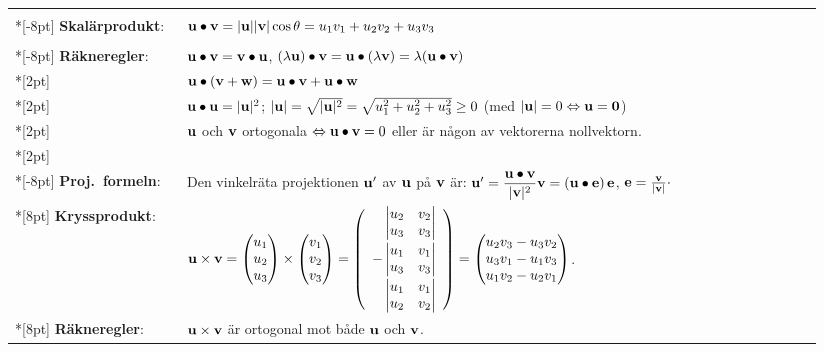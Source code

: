 \documentclass{article}
\begin{document}
\begin{tabular}{|p{0.2\linewidth}|p{0.745\linewidth}|}
  \hline &\\*[-8pt]
  \textbf{Skalärprodukt}:
  &
  ${\mathbf u}\bullet{\mathbf v}=|{\mathbf u}||{\mathbf v}|\cos\theta = u_1v_1+u_2v_2+u_3v_3$
  \\ &\\*[-8pt]
  \textbf{Räkneregler}:
  &
  ${\mathbf u}\bullet{\mathbf v}={\mathbf v}\bullet {\mathbf u}$, 
  $(\lambda{\mathbf u})\bullet{\mathbf v}={\mathbf u}\bullet(\lambda{\mathbf v})=\lambda({\mathbf u}\bullet{\mathbf v})$
  \\*[2pt]
  &${\mathbf u}\bullet({\mathbf v}+{\mathbf w})={\mathbf u}\bullet{\mathbf v}+{\mathbf u}\bullet{\mathbf w}$
  \\*[2pt]
  &${\mathbf u}\bullet{\mathbf u}=|{\mathbf u}|^2$;
  $|{\mathbf u}|=\sqrt{|{\mathbf u}|^2}=\sqrt{u_1^2+u_2^2+u_3^2}\ge0$ 
  (med $|{\mathbf u}|=0\Leftrightarrow{\mathbf u}=\mathbf 0$)
  \\*[2pt]
  &${\mathbf u}$ och ${\mathbf v}$ ortogonala $\Leftrightarrow{\mathbf u}\bullet{\mathbf v}=0$ eller är någon av vektorerna nollvektorn.
\\*[2pt]\hline&\\*[-8pt]
  \textbf{Proj.~formeln}:
  &
  Den vinkelräta projektionen ${\mathbf u}'$ av
  ${\mathbf u}$ på ${\mathbf v}$ är:
  ${\mathbf u}'=\dfrac{{\mathbf u}\bullet{\mathbf v}}{|{\mathbf v}|^2}{\mathbf v} = ({\mathbf u}\bullet{\mathbf e})\,{\mathbf e}$, 
  ${\mathbf e}=\frac{{\mathbf v}}{|{\mathbf v}|}\cdot$
  \\*[8pt] \hline
  \textbf{Kryssprodukt}:
  &  %
  $\bdu\times\bdv=\trevektor[u_1,u_2,u_3]\times\trevektor[v_1,v_2,v_3]
  =
  \left(\begin{array}{r}
      \begin{vmatrix}
        u_2 & v_2\\
        u_3 & v_3\\
      \end{vmatrix} 
   \\*[8pt] 
  -   \begin{vmatrix}
        u_1 & v_1\\
        u_3 & v_3\\
      \end{vmatrix} 
    \\*[8pt]
      \begin{vmatrix}
        u_1 & v_1\\
        u_2 & v_2\\
      \end{vmatrix} 
    \end{array}\right) 
  =\trevektor[u_2v_3-u_3v_2,u_3v_1-u_1v_3,u_1v_2-u_2v_1]$.
  \\*[8pt] 
  \textbf{Räkneregler}:
  &
  ${\mathbf u}\times{\mathbf v}$ är ortogonal mot både ${\mathbf u}$ och ${\mathbf v}$.

\end{tabular}
\end{document}
